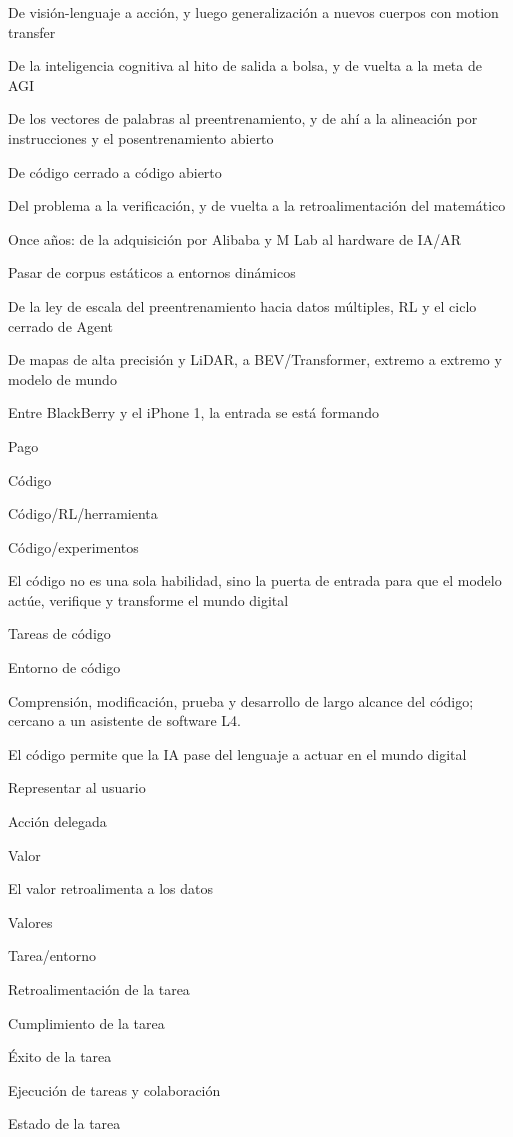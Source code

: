 \documentclass{article}
\begin{document}
De visión-lenguaje a acción, y luego generalización a nuevos cuerpos con motion transfer

De la inteligencia cognitiva al hito de salida a bolsa, y de vuelta a la meta de AGI

De los vectores de palabras al preentrenamiento, y de ahí a la alineación por instrucciones y el posentrenamiento abierto

De código cerrado a código abierto

Del problema a la verificación, y de vuelta a la retroalimentación del matemático

Once años: de la adquisición por Alibaba y M Lab al hardware de IA/AR

Pasar de corpus estáticos a entornos dinámicos

De la ley de escala del preentrenamiento hacia datos múltiples, RL y el ciclo cerrado de Agent

De mapas de alta precisión y LiDAR, a BEV/Transformer, extremo a extremo y modelo de mundo

Entre BlackBerry y el iPhone 1, la entrada se está formando

Pago

Código

Código/RL/herramienta

Código/experimentos

El código no es una sola habilidad, sino la puerta de entrada para que el modelo actúe, verifique y transforme el mundo digital

Tareas de código

Entorno de código

Comprensión, modificación, prueba y desarrollo de largo alcance del código; cercano a un asistente de software L4.

El código permite que la IA pase del lenguaje a actuar en el mundo digital

Representar al usuario

Acción delegada

Valor

El valor retroalimenta a los datos

Valores

Tarea/entorno

Retroalimentación de la tarea

Cumplimiento de la tarea

Éxito de la tarea

Ejecución de tareas y colaboración

Estado de la tarea
\end{document}
